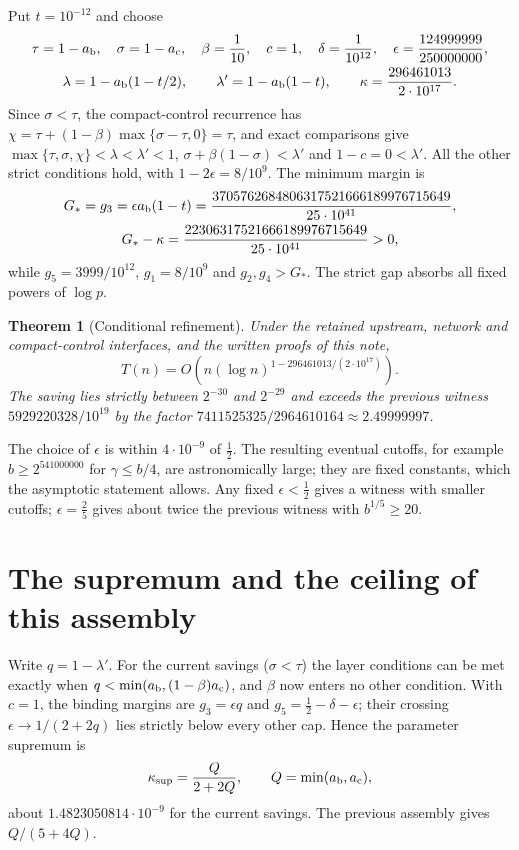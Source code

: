 \documentclass[11pt]{article}
\newtheorem{theorem}{Theorem}
\newcommand{\ab}{a_{\rm b}}
\newcommand{\ac}{a_{\rm c}}
\begin{document}
Put $t=10^{-12}$ and choose
\[
\begin{gathered}
 \tau=1-\ab,\quad\sigma=1-\ac,\quad\beta=\frac1{10},\quad c=1,\quad
 \delta=\frac1{10^{12}},\quad
 \epsilon=\frac{124999999}{250000000},\\
 \lambda=1-\ab(1-t/2),\qquad\lambda'=1-\ab(1-t),\qquad
 \kappa=\frac{296461013}{2\cdot10^{17}}.
\end{gathered}
\]
Since $\sigma<\tau$, the compact-control recurrence has
$\chi=\tau+(1-\beta)\max\{\sigma-\tau,0\}=\tau$, and exact comparisons give
$\max\{\tau,\sigma,\chi\}<\lambda<\lambda'<1$,
$\sigma+\beta(1-\sigma)<\lambda'$ and $1-c=0<\lambda'$. All the other strict
conditions hold, with $1-2\epsilon=8/10^9$. The minimum margin is
\[
\begin{gathered}
 G_*=g_3=\epsilon\ab(1-t)=\frac{3705762684806317521666189976715649}{25\cdot10^{41}},\\
 G_*-\kappa=\frac{22306317521666189976715649}{25\cdot10^{41}}>0,
\end{gathered}
\]
while $g_5=3999/10^{12}$, $g_1=8/10^9$ and $g_2,g_4>G_*$. The strict gap
absorbs all fixed powers of $\log p$.

\begin{theorem}[Conditional refinement]
Under the retained upstream, network and compact-control interfaces, and the
written proofs of this note,
\[
 T(n)=O\!\left(n(\log n)^{1-296461013/(2\cdot10^{17})}\right).
\]
The saving lies strictly between $2^{-30}$ and $2^{-29}$ and exceeds the
previous witness $5929220328/10^{19}$ by the factor
$7411525325/2964610164\approx2.49999997$.
\end{theorem}

The choice of $\epsilon$ is within $4\cdot10^{-9}$ of $\frac12$. The resulting
eventual cutoffs, for example $b\ge2^{541000000}$ for $\gamma\le b/4$, are
astronomically large; they are fixed constants, which the asymptotic
statement allows. Any fixed $\epsilon<\frac12$ gives a witness with smaller
cutoffs; $\epsilon=\frac25$ gives about twice the previous witness with
$b^{1/5}\ge20$.

\section{The supremum and the ceiling of this assembly}
Write $q=1-\lambda'$. For the current savings ($\sigma<\tau$) the layer
conditions can be met exactly when $q<\min(\ab,(1-\beta)\ac)$, and $\beta$
now enters no other condition. With
$c=1$, the binding margins are $g_3=\epsilon q$ and
$g_5=\frac12-\delta-\epsilon$; their crossing $\epsilon\to1/(2+2q)$ lies
strictly below every other cap. Hence the parameter supremum is
\[
 \kappa_{\sup}=\frac Q{2+2Q},\qquad Q=\min(\ab,\ac),
\]
about $1.4823050814\cdot10^{-9}$ for the current savings. The previous
assembly gives $Q/(5+4Q)$.
\end{document}
